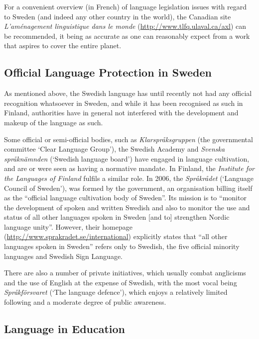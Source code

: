 \begin{multicols}{2}
For a convenient overview (in French) of language legislation issues
with regard to Sweden (and indeed any other country in the world), the
Canadian site \textit{L'aménagement linguistique dans le
  monde} (\url{http://www.tlfq.ulaval.ca/axl}) can be recommended,
it being as accurate as one can reasonably expect from a work that
aspires to cover the entire planet.

\subsection{Official Language Protection in Sweden}

As mentioned above, the Swedish language has until recently not had
any official recognition whatsoever in Sweden, and while it has been
recognised as such in Finland, authorities have in general not
interfered with the development and makeup of the language as such.


Some official or semi-official bodies, such as
\textit{Klarspråksgruppen} (the governmental committee ‘Clear Language
Group’), the Swedish Academy and \textit{Svenska språknämnden}
(`Swedish language board') have engaged in language cultivation, and
are or were seen as having a normative mandate. In Finland, the
\textit{Institute for the Languages of Finland} fulfils a similar
role. In 2006, the \textit{Språkrådet} (`Language Council of Sweden'),
was formed by the government, an organisation billing itself as the
``official language cultivation body of Sweden''. Its mission is to
``monitor the development of spoken and written Swedish and also to
monitor the use and status of all other languages spoken in Sweden
[and to] strengthen Nordic language unity''. However, their
homepage (\url{http://www.sprakradet.se/international}) explicitly
states that ``all other languages spoken in Sweden'' refers only to
Swedish, the five official minority languages and Swedish Sign
Language.

There are also a number of private initiatives, which usually combat
anglicisms and the use of English at the expense of Swedish, with the
most vocal being \textit{Språkförsvaret} (`The language defence'),
which enjoys a relatively limited following and a moderate degree of
public awareness.

\subsection{Language in Education}


\end{multicols}
